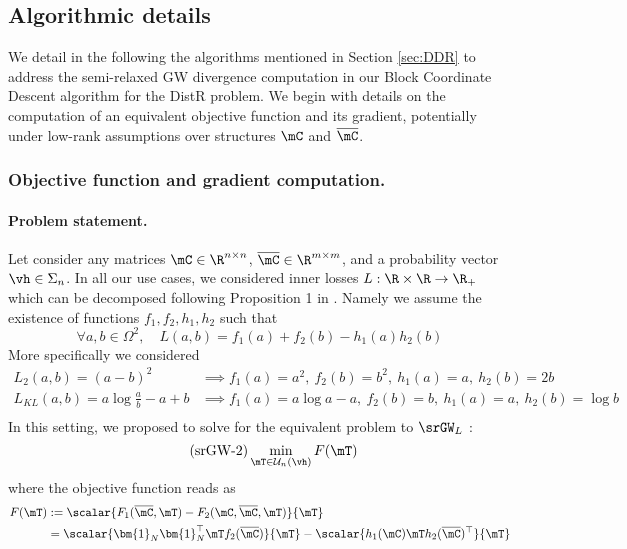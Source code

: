 \subsection{Algorithmic details}\label{sec:algorithms}

We detail in the following the algorithms mentioned in Section \ref{sec:DDR} to address the semi-relaxed GW divergence computation in our Block Coordinate Descent algorithm for the DistR problem. We begin with details on the computation of an equivalent objective function and its gradient, potentially under low-rank assumptions over structures $\mC$ and $\overline{\mC}$.

\subsubsection{Objective function and gradient computation.}\label{subsec:GWloss} 

\paragraph{Problem statement.} Let consider any matrices $\mC \in \R^{n \times n}$, $\overline{\mC} \in \R^{m \times m}$, and a probability vector $\vh \in \Sigma_n$. In all our use cases,  we considered inner losses $L: \R \times \R \rightarrow \R_+$ which can be decomposed following Proposition 1 in \cite{peyre2016gromov}. Namely we assume the existence of functions $f_1, f_2, h_1, h_2$ such that 
\begin{equation}\label{eq:loss_decomposition}
\forall a, b \in \Omega^2, \quad L(a, b) = f_1(a) + f_2(b) - h_1(a) h_2(b)
\end{equation}
More specifically we considered
\begin{equation} \tag{L2}\label{eq:L2_loss}
\begin{split}
	L_2(a,b) = (a-b)^2 &\implies f_1(a) = a^2, \: f_2(b) = b^2, \: h_1(a) = a, \: h_2(b) = 2b \\
	L_{KL}(a,b ) = a \log \frac{a}{b} - a +b &\implies f_1(a) = a \log a -a, \: f_2(b) = b, \: h_1(a) = a, \: h_2(b) = \log b \\
\end{split}
\end{equation}
In this setting, we proposed to solve for the equivalent problem to $\srGW_L$ :
\begin{equation}\label{eq:srgw_eqpb}\tag{srGW-2}
\min_{\mT \in \mathcal{U}_n(\vh)} F(\mT)
\end{equation}
where the objective function reads as 
\begin{equation}\label{eq:expressionF}
\begin{split}
	F(\mT) &:= \scalar{F_1(\overline{\mC}, \mT) - F_2(\mC, \overline{\mC}, \mT)}{\mT} \\ 
	&= \scalar{\bm{1}_N \bm{1}_N^\top \mT f_2(\overline{\mC})}{ \mT} - \scalar{h_1(\mC) \mT h_2(\overline{\mC})^\top}{\mT}
\end{split}
\end{equation}

